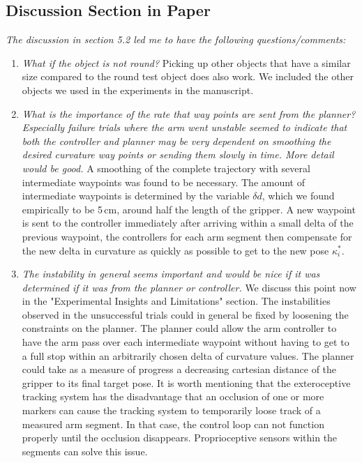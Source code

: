 \documentclass[letterpaper, 10 pt, twocolumn, conference]{article}
\newcommand{\unit}[1]{\ensuremath{\, \mathrm{#1}}} %
\begin{document}
\subsection{Discussion Section in Paper}
\textit{The discussion in section 5.2 led me to have the following questions/comments:}
\begin{enumerate}
\item \textit{What if the object is not round?}
%
Picking up other objects that have a similar size compared to the round test object does also work. We included the other objects we used in the experiments in the manuscript. 
%
\item \textit{What is the importance of the rate that way points are sent from the planner? Especially failure trials where the arm went unstable seemed to indicate that both the controller and planner may be very dependent on smoothing the desired curvature way points or sending them slowly in time. More detail would be good.}
%
A smoothing of the complete trajectory with several intermediate waypoints was found to be necessary. The amount of intermediate waypoints is determined by the variable $\delta d$, which we found empirically to be 5\unit{cm}, around half the length of the gripper. A new waypoint is sent to the controller immediately after arriving within a small delta of the previous waypoint, the controllers for each arm segment then compensate for the new delta in curvature as quickly as possible to get to the new pose $\kappa_i^*$.
%
\item \textit{ The instability in general seems important and would be nice if it was determined if it was from the planner or controller.}
%
We discuss this point now in the "Experimental Insights and Limitations" section. The instabilities observed in the unsuccessful trials could in general be fixed by loosening the constraints on the planner. The planner could allow the arm controller to have the arm pass over each intermediate waypoint without having to get to a full stop within an arbitrarily chosen delta of curvature values. The planner could take as a measure of progress a decreasing cartesian distance of the gripper to its final target pose.
It is worth mentioning that the exteroceptive tracking system has the disadvantage that an occlusion of one or more markers can cause the tracking system to temporarily loose track of a measured arm segment. In that case, the control loop can not function properly until the occlusion disappears. Proprioceptive sensors within the segments can solve this issue.
%
\end{enumerate}
\end{document}
